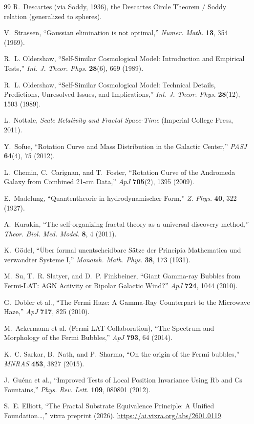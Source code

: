 \documentclass[11pt,a4paper]{article}
\begin{document}
\begin{thebibliography}{99}
R.~Descartes (via Soddy, 1936), the Descartes Circle Theorem / Soddy
relation (generalized to spheres).

V.~Strassen, ``Gaussian elimination is not optimal,'' \textit{Numer. Math.}
\textbf{13}, 354 (1969).

R.~L. Oldershaw, ``Self-Similar Cosmological Model: Introduction and
Empirical Tests,'' \textit{Int. J. Theor. Phys.} \textbf{28}(6), 669 (1989).

R.~L. Oldershaw, ``Self-Similar Cosmological Model: Technical Details,
Predictions, Unresolved Issues, and Implications,'' \textit{Int. J. Theor.
Phys.} \textbf{28}(12), 1503 (1989).

L.~Nottale, \textit{Scale Relativity and Fractal Space-Time} (Imperial
College Press, 2011).

Y.~Sofue, ``Rotation Curve and Mass Distribution in the Galactic Center,''
\textit{PASJ} \textbf{64}(4), 75 (2012).

L.~Chemin, C.~Carignan, and T.~Foster, ``Rotation Curve of the Andromeda
Galaxy from Combined 21-cm Data,'' \textit{ApJ} \textbf{705}(2), 1395
(2009).

E.~Madelung, ``Quantentheorie in hydrodynamischer Form,''
\textit{Z. Phys.} \textbf{40}, 322 (1927).

A.~Kurakin, ``The self-organizing fractal theory as a universal discovery
method,'' \textit{Theor. Biol. Med. Model.} \textbf{8}, 4 (2011).

K.~Gödel, ``Über formal unentscheidbare Sätze der Principia Mathematica und
verwandter Systeme I,'' \textit{Monatsh. Math. Phys.} \textbf{38}, 173
(1931).

M.~Su, T.~R. Slatyer, and D.~P. Finkbeiner, ``Giant Gamma-ray Bubbles from
Fermi-LAT: AGN Activity or Bipolar Galactic Wind?'' \textit{ApJ} \textbf{724},
1044 (2010).

G.~Dobler et al., ``The Fermi Haze: A Gamma-Ray Counterpart to the
Microwave Haze,'' \textit{ApJ} \textbf{717}, 825 (2010).

M.~Ackermann et al. (Fermi-LAT Collaboration), ``The Spectrum and
Morphology of the Fermi Bubbles,'' \textit{ApJ} \textbf{793}, 64 (2014).

K.~C. Sarkar, B.~Nath, and P.~Sharma, ``On the origin of the Fermi bubbles,''
\textit{MNRAS} \textbf{453}, 3827 (2015).

J.~Guéna et al., ``Improved Tests of Local Position Invariance Using
Rb and Cs Fountains,'' \textit{Phys. Rev. Lett.} \textbf{109}, 080801
(2012).

S.~E. Elliott, ``The Fractal Substrate Equivalence Principle: A Unified
Foundation\ldots,'' vixra preprint (2026).
\url{https://ai.vixra.org/abs/2601.0119}.

\end{thebibliography}
\end{document}
